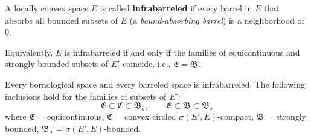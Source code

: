 A locally convex space $E$ is called \textbf{infrabarreled} if every barrel in $E$ that absorbs all bounded subsets of $E$ (a \emph{bound-absorbing barrel}) is a neighborhood of $0$.

Equivalently, $E$ is infrabarreled if and only if the families of equicontinuous and strongly bounded subsets of $E'$ coincide, i.e., $\mathfrak{E} = \mathfrak{B}$.

Every bornological space and every barreled space is infrabarreled. The following inclusions hold for the families of subsets of $E'$:
$$\mathfrak{E} \subset \mathfrak{C} \subset \mathfrak{B}_\sigma, \qquad \mathfrak{E} \subset \mathfrak{B} \subset \mathfrak{B}_\sigma$$
where $\mathfrak{E}$ = equicontinuous, $\mathfrak{C}$ = convex circled $\sigma(E', E)$-compact, $\mathfrak{B}$ = strongly bounded, $\mathfrak{B}_\sigma$ = $\sigma(E', E)$-bounded.
